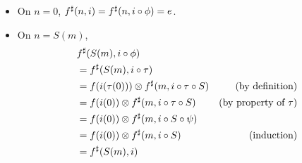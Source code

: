 \begin{itemize}
    \item On $n = 0$, $\ext{f}(n, i) \id \ext{f}(n, i \circ \phi) = e$.
    \item On $n = S(m)$,
        \begin{align*}
        & {f}^{\sharp}(S(m), i \circ \phi) \\
        & = {f}^{\sharp}(S(m), i \circ \tau) \\
        & = f(i(\tau(0))) \otimes {f}^{\sharp}(m, i \circ \tau \circ S) & \text{(by definition)} \\
        & = f(i(0)) \otimes {f}^{\sharp}(m, i \circ \tau \circ S) & \text{(by property of $\tau$)} \\
        & = f(i(0)) \otimes {f}^{\sharp}(m, i \circ S \circ \psi) \\
        & = f(i(0)) \otimes {f}^{\sharp}(m, i \circ S) & \text{(induction)} \\
        & = {f}^{\sharp}(S(m), i)
        \end{align*}
\end{itemize}

